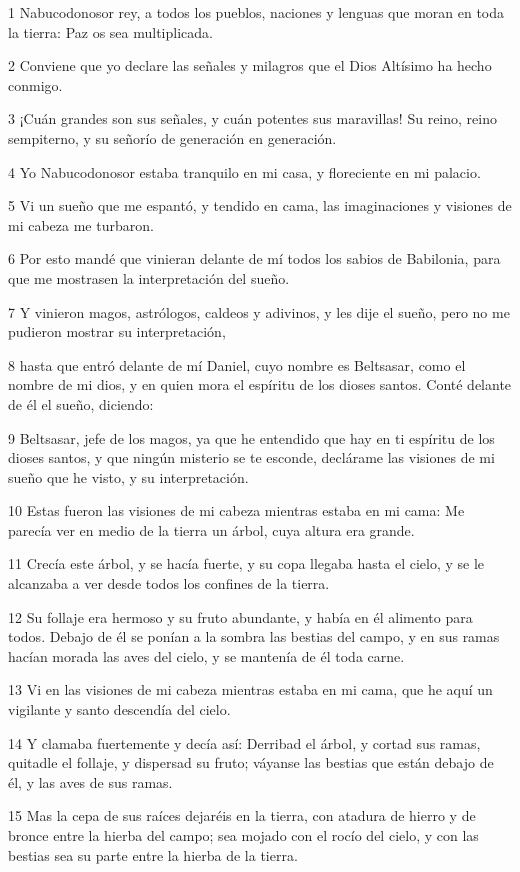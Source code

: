 \par 1 Nabucodonosor rey, a todos los pueblos, naciones y lenguas que moran en toda la tierra: Paz os sea multiplicada.
\par 2 Conviene que yo declare las señales y milagros que el Dios Altísimo ha hecho conmigo.
\par 3 ¡Cuán grandes son sus señales, y cuán potentes sus maravillas! Su reino, reino sempiterno, y su señorío de generación en generación.
\par 4 Yo Nabucodonosor estaba tranquilo en mi casa, y floreciente en mi palacio.
\par 5 Vi un sueño que me espantó, y tendido en cama, las imaginaciones y visiones de mi cabeza me turbaron.
\par 6 Por esto mandé que vinieran delante de mí todos los sabios de Babilonia, para que me mostrasen la interpretación del sueño.
\par 7 Y vinieron magos, astrólogos, caldeos y adivinos, y les dije el sueño, pero no me pudieron mostrar su interpretación,
\par 8 hasta que entró delante de mí Daniel, cuyo nombre es Beltsasar, como el nombre de mi dios, y en quien mora el espíritu de los dioses santos. Conté delante de él el sueño, diciendo:
\par 9 Beltsasar, jefe de los magos, ya que he entendido que hay en ti espíritu de los dioses santos, y que ningún misterio se te esconde, declárame las visiones de mi sueño que he visto, y su interpretación.
\par 10 Estas fueron las visiones de mi cabeza mientras estaba en mi cama: Me parecía ver en medio de la tierra un árbol, cuya altura era grande.
\par 11 Crecía este árbol, y se hacía fuerte, y su copa llegaba hasta el cielo, y se le alcanzaba a ver desde todos los confines de la tierra.
\par 12 Su follaje era hermoso y su fruto abundante, y había en él alimento para todos. Debajo de él se ponían a la sombra las bestias del campo, y en sus ramas hacían morada las aves del cielo, y se mantenía de él toda carne.
\par 13 Vi en las visiones de mi cabeza mientras estaba en mi cama, que he aquí un vigilante y santo descendía del cielo.
\par 14 Y clamaba fuertemente y decía así: Derribad el árbol, y cortad sus ramas, quitadle el follaje, y dispersad su fruto; váyanse las bestias que están debajo de él, y las aves de sus ramas.
\par 15 Mas la cepa de sus raíces dejaréis en la tierra, con atadura de hierro y de bronce entre la hierba del campo; sea mojado con el rocío del cielo, y con las bestias sea su parte entre la hierba de la tierra.
